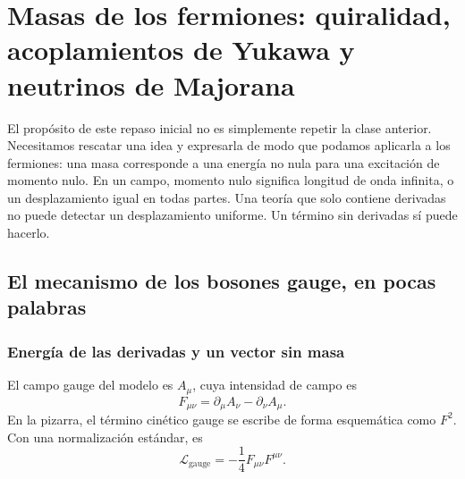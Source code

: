 \chapter{Masas de los fermiones: quiralidad, acoplamientos de Yukawa y neutrinos de Majorana}


El propósito de este repaso inicial no es simplemente repetir la clase anterior. Necesitamos rescatar una idea y expresarla de modo que podamos aplicarla a los fermiones: una masa corresponde a una energía no nula para una excitación de momento nulo. En un campo, momento nulo significa longitud de onda infinita, o un desplazamiento igual en todas partes. Una teoría que solo contiene derivadas no puede detectar un desplazamiento uniforme. Un término sin derivadas sí puede hacerlo.

\section{El mecanismo de los bosones gauge, en pocas palabras}

\subsection{Energía de las derivadas y un vector sin masa}

El campo gauge del modelo es \(A_\mu\), cuya intensidad de campo es
\begin{equation}
  F_{\mu\nu}
  =\partial_\mu A_\nu-\partial_\nu A_\mu .
  \label{eq:l09-field-strength}
\end{equation}
En la pizarra, el término cinético gauge se escribe de forma esquemática como \(F^2\). Con una normalización estándar, es
\begin{equation}
  \mathcal L_{\mathrm{gauge}}
  =-\frac14 F_{\mu\nu}F^{\mu\nu}.
  \label{eq:l09-gauge-kinetic}
\end{equation}

